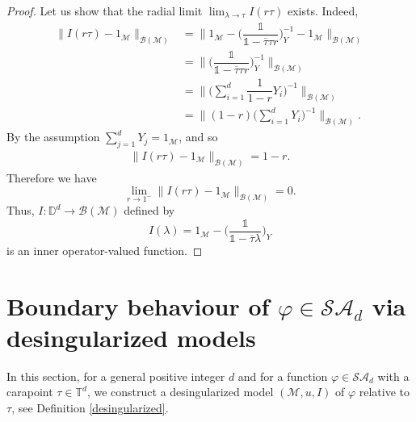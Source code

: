 \documentclass[11pt, reqno]{amsart}
\newcommand\1{\boldsymbol {1}}
\numberwithin{equation}{section}
\begin{document}
\begin{proof}
Let us show that the radial limit $\lim_{\lambda\rightarrow\tau}I(r\tau)$ exists. Indeed,
\begin{align*}
    \|I(r\tau)-1_{\mathcal{M}}\|_{\mathcal{B(M)}}&=\Bigg\| 1_{\mathcal{M}}-\bigg(\dfrac{\mathds{1}}{\mathds{1}-\overline{\tau}\tau r}\bigg)_{Y}^{-1}-1_{\mathcal{M}}\Bigg\|_{\mathcal{B(M)}} \\
&=\Bigg\| \bigg(\dfrac{\mathds{1}}{\mathds{1}-\overline{\tau}\tau r}\bigg)_{Y}^{-1} \Bigg\|_{\mathcal{B(M)}} \\
&=\Bigg\| \bigg(\sum_{i=1}^{d}\dfrac{1}{1-r}Y_{i}\bigg)^{-1} \Bigg\|_{\mathcal{B(M)}} \\
&=\Bigg\| (1-r)\bigg(\sum_{i=1}^{d}Y_{i}\bigg)^{-1} \Bigg\|_{\mathcal{B(M)}}.
\end{align*}
By the assumption $\sum_{j=1}^{d}Y_{j}=1_{\mathcal{M}}$, and so
\begin{align*}
\|I(r\tau)-1_{\mathcal{M}}\|_{\mathcal{B(M)}}=1-r.
\end{align*}
Therefore we have
$$\lim_{r\rightarrow 1^{-}} \|I(r\tau)-1_{\mathcal{M}}\|_{\mathcal{B(M)}} = 0.$$
Thus, $I:\mathbb{D}^{d}\rightarrow \mathcal{B(M)}$ defined by
$$I(\lambda) = 1_{\mathcal{M}}-\bigg(\dfrac{\mathds{1}}{\mathds{1}-\overline{\tau}\lambda}\bigg)_{Y}$$
is an inner operator-valued function. \end{proof}


\section{Boundary behaviour of $\varphi\in\mathcal{SA}_{d}$ via desingularized models}\label{main_result}

In this section, for a general positive integer $d$ and for a function $\varphi\in\mathcal{SA}_{d}$ with a carapoint $\tau\in\mathbb{T}^{d}$, we construct a desingularized model $(\mathcal{M},u,I)$ of $\varphi$ relative to $\tau$, 
 see Definition \ref{desingularized}. 
 
\end{document}
